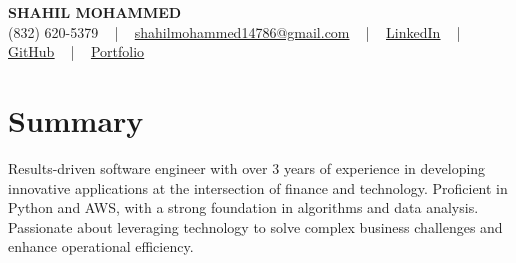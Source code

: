 \documentclass[letterpaper,10pt]{article}
\begin{document}
\begin{center}
    {\fontsize{14pt}{12pt}\selectfont \textbf{\MakeUppercase{Shahil Mohammed}}}\\ \vspace{2pt}
    \fontsize{10pt}{12pt}\selectfont (832) 620-5379 ~ | ~ \href{mailto:shahilmohammed14786@gmail.com}{shahilmohammed14786@gmail.com} ~ | ~  
    \href{https://www.linkedin.com/in/shahil-mohammed-9652931a1/}{\color{blue}\underline{LinkedIn}}  ~ | ~ 
    \href{https://github.com/freakbeast14}{\color{blue}\underline{GitHub}} ~ | ~ 
    \href{https://shahil-mohammed.netlify.app/}{\color{blue}\underline{Portfolio}}
    \vspace{-8pt}
\end{center}

\section{Summary}
\vspace{-2pt}\fontsize{8pt}{9pt}\selectfont
Results-driven software engineer with over 3 years of experience in developing innovative applications at the intersection of finance and technology. Proficient in Python and AWS, with a strong foundation in algorithms and data analysis. Passionate about leveraging technology to solve complex business challenges and enhance operational efficiency.
 \vspace{-5pt}
 
\vspace{-2pt}
\end{document}
